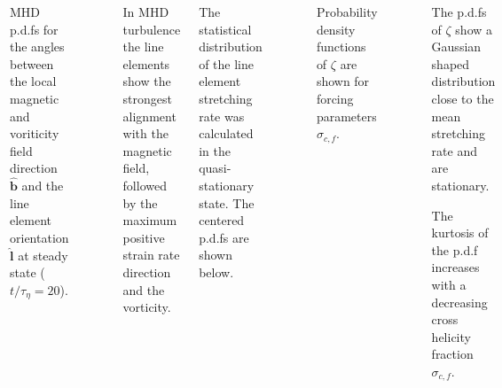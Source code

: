 \documentclass[20pt, a0paper, portrait, margin=15mm, innermargin=15mm,
     blockverticalspace=15mm, colspace=15mm, subcolspace=8mm]{tikzposter} %
\newcommand{\va}[1]{\bm{#1}}
\newcommand{\plot}[3]{
\begin{figure}[H]
    \centering
    \tiny
    \scalebox{1.3}{}
    \caption{\footnotesize{#2}}
    \label{#3}
\end{figure}
}
\begin{document}
\begin{columns}
{\begin{minipage}[t]{20cm}
                \vspace{0.7cm}

                \plot{figures/histograms/mhd_angle_histo_t20}
				{MHD p.d.fs for the angles between the local magnetic and voriticity field direction $\va{\hat{b}}$ and the
                    line element orientation $\va{\hat{l}}$ at steady state ($t/\tau_{\eta} = 20$).}
                    {mhd_strain_magnetic_angle_histo}

                \begin{itemsposter}
                    \item In MHD turbulence the line elements show the strongest
                        alignment with the magnetic field, followed by the 
                        maximum positive strain rate direction and the vorticity.

                \end{itemsposter}
                \vspace{1.0cm}

            \end{minipage}
            \hfill
            \begin{minipage}[t]{20cm}

                \vspace{2.5cm}
                    \vspace{0.7cm}
                    
                    The statistical distribution of the line element stretching
                    rate was calculated in the quasi-stationary state. The
                    centered p.d.fs are shown below.

                    \vspace{0.7cm}

                    \plot{figures/histograms/mhd_zeta_histo_t20_256}
						{Probability density functions of $\zeta$ are shown for
						forcing parameters $\sigma_{c,f}$.}
						{histo}

                    \begin{itemsposter}
                        \item The p.d.fs of $\zeta $ show
                              a Gaussian shaped distribution close to the mean
                              stretching rate and are stationary.

                        \vspace{0.5cm}

                        \item The kurtosis of the p.d.f increases with a decreasing
                            cross helicity fraction $\sigma_{c, f}$.
                    \end{itemsposter}
                
                    \vspace{1.0cm}
            \end{minipage}
        }
	
	\end{columns}
	
\end{document}
